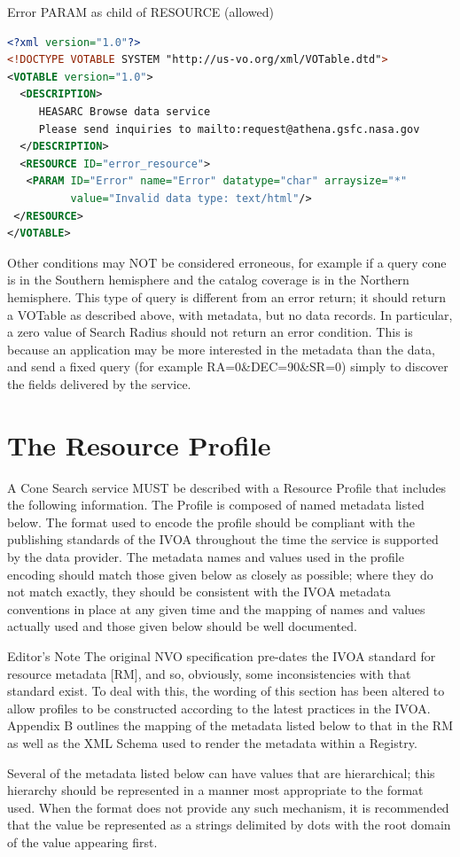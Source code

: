 \documentclass[11pt,a4paper]{ivoa}
\begin{document}
\begin{enumerate}
\begin{bigdescription}
	Error PARAM as child of RESOURCE (allowed)
	\begin{lstlisting}[language=XML,basicstyle=\footnotesize]
<?xml version="1.0"?>
<!DOCTYPE VOTABLE SYSTEM "http://us-vo.org/xml/VOTable.dtd">
<VOTABLE version="1.0">
  <DESCRIPTION>
     HEASARC Browse data service
     Please send inquiries to mailto:request@athena.gsfc.nasa.gov
  </DESCRIPTION>
  <RESOURCE ID="error_resource">
   <PARAM ID="Error" name="Error" datatype="char" arraysize="*"
          value="Invalid data type: text/html"/>
 </RESOURCE>
</VOTABLE>
	\end{lstlisting}
	\end{bigdescription}
	Other conditions may NOT be considered erroneous, for example if a query cone is in the Southern hemisphere and the catalog coverage is in the Northern hemisphere. This type of query is different from an error return; it should return a VOTable as described above, with metadata, but no data records. In particular, a zero value of Search Radius should not return an error condition. This is because an application may be more interested in the metadata than the data, and send a fixed query (for example RA=0\&DEC=90\&SR=0) simply to discover the fields delivered by the service.
\end{enumerate}

\section{The Resource Profile}
\label{sec:3}
A Cone Search service MUST be described with a Resource Profile that includes the following information. The Profile is composed of named metadata listed below. The format used to encode the profile should be compliant with the publishing standards of the IVOA throughout the time the service is supported by the data provider. The metadata names and values used in the profile encoding should match those given below as closely as possible; where they do not match exactly, they should be consistent with the IVOA metadata conventions in place at any given time and the mapping of names and values actually used and those given below should be well documented.
\begin{bigdescription}
\item[Editor's Note] The original NVO specification pre-dates the IVOA standard for resource metadata [RM], and so, obviously, some inconsistencies with that standard exist. To deal with this, the wording of this section has been altered to allow profiles to be constructed according to the latest practices in the IVOA. Appendix B outlines the mapping of the metadata listed below to that in the RM as well as the XML Schema used to render the metadata within a Registry.
\end{bigdescription}
Several of the metadata listed below can have values that are hierarchical; this hierarchy should be represented in a manner most appropriate to the format used. When the format does not provide any such mechanism, it is recommended that the value be represented as a strings delimited by dots with the root domain of the value appearing first.
\end{document}
